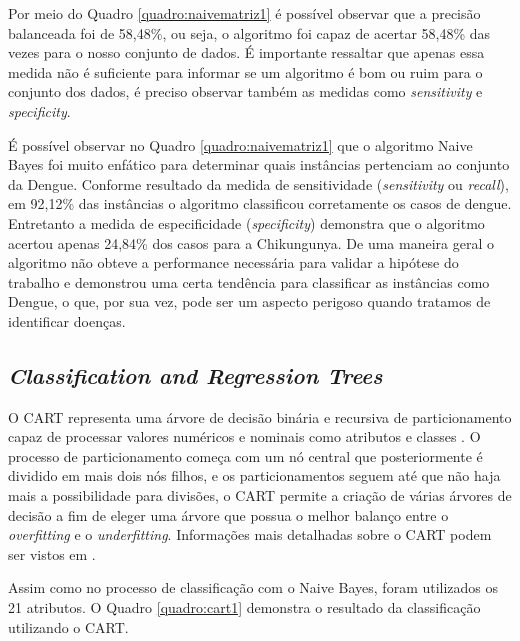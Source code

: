 Por meio do Quadro \ref{quadro:naivematriz1} é possível observar que a precisão balanceada foi de 58,48\%, ou seja, o algoritmo foi capaz de acertar 58,48\% das vezes para o nosso conjunto de dados. É importante ressaltar que apenas essa medida não é suficiente para informar se um algoritmo é bom ou ruim para o conjunto dos dados, é preciso observar também as medidas como \textit{sensitivity} e \textit{specificity}.

É possível observar no Quadro \ref{quadro:naivematriz1} que o algoritmo Naive Bayes foi muito enfático para determinar quais instâncias pertenciam ao conjunto da Dengue. Conforme resultado da medida de sensitividade (\textit{sensitivity} ou \textit{recall}), em 92,12\% das instâncias o algoritmo classificou corretamente os casos de dengue. Entretanto a medida de especificidade (\textit{specificity}) demonstra que o algoritmo acertou apenas 24,84\% dos casos para a Chikungunya. De uma maneira geral o algoritmo não obteve a performance necessária para validar a hipótese do trabalho e demonstrou uma certa tendência para classificar as instâncias como Dengue, o que, por sua vez, pode ser um aspecto perigoso quando tratamos de identificar doenças.

\subsection{\textit{Classification and Regression Trees}}

O CART representa uma árvore de decisão binária e recursiva de particionamento capaz de processar valores numéricos e nominais como atributos e classes \cite{steinberg2009cart}. O processo de particionamento começa com um nó central que posteriormente é dividido em mais dois nós filhos, e os particionamentos seguem até que não haja mais a possibilidade para divisões, o CART permite a criação de várias árvores de decisão a fim de eleger uma árvore que possua o melhor balanço entre o \textit{overfitting} e o \textit{underfitting}. Informações mais detalhadas sobre o CART podem ser vistos em .

Assim como no processo de classificação com o Naive Bayes, foram utilizados os 21 atributos. O Quadro \ref{quadro:cart1} demonstra o resultado da classificação utilizando o CART.


